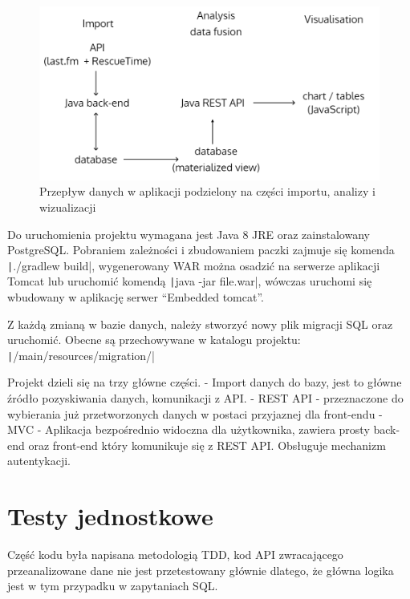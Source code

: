 \documentclass[openright]{xmgr}
\begin{document}
    \begin{figure}
        \includegraphics[width=\linewidth]{fig/data-flow.png}
        \caption{Przepływ danych w aplikacji podzielony na części importu, analizy i wizualizacji}
        \label{fig:data-flow}
    \end{figure}

    Do uruchomienia projektu wymagana jest Java 8 JRE oraz zainstalowany PostgreSQL.
    Pobraniem zależności i zbudowaniem paczki zajmuje się komenda \texttt|./gradlew build|,
    wygenerowany WAR można osadzić na serwerze aplikacji Tomcat lub uruchomić komendą \texttt|java -jar file.war|,
    wówczas uruchomi się wbudowany w aplikację serwer ``Embedded tomcat''.

    Z każdą zmianą w bazie danych, należy stworzyć nowy plik migracji SQL oraz uruchomić.
    Obecne są przechowywane w katalogu projektu: \texttt|/main/resources/migration/|

    Projekt dzieli się na trzy główne części.
    - Import danych do bazy, jest to główne źródło pozyskiwania danych, komunikacji z API.
    - REST API - przeznaczone do wybierania już przetworzonych danych w postaci przyjaznej dla front-endu
    - MVC - Aplikacja bezpośrednio widoczna dla użytkownika, zawiera prosty back-end oraz front-end który komunikuje się z REST API.
    Obsługuje mechanizm autentykacji.


\section{Testy jednostkowe}

Część kodu była napisana metodologią TDD,
kod API zwracającego przeanalizowane dane nie jest przetestowany głównie dlatego,
że główna logika jest w tym przypadku w zapytaniach SQL.
\end{document}
